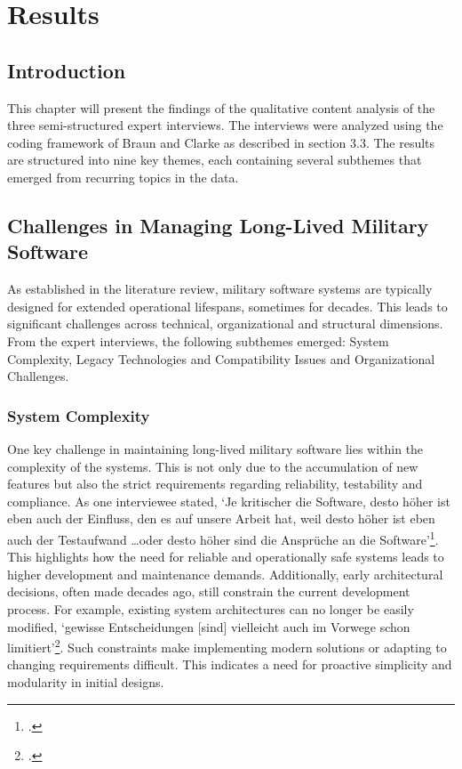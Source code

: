\section{Results}
\subsection{Introduction}
This chapter will present the findings of the qualitative content analysis of the three semi-structured expert interviews. The interviews were analyzed using the coding framework of Braun and Clarke as described in section 3.3.
The results are structured into nine key themes, each containing several subthemes that emerged from recurring topics in the data.
\subsection{Challenges in Managing Long-Lived Military Software}
As established in the literature review, military software systems are typically designed for extended operational lifespans, sometimes for decades. This leads to significant challenges across technical, organizational and structural dimensions.
From the expert interviews, the following subthemes emerged: System Complexity, Legacy Technologies and Compatibility Issues and Organizational Challenges.

\subsubsection{System Complexity}
One key challenge in maintaining long-lived military software lies within the complexity of the systems. This is not only due to the accumulation of new features but also the strict requirements regarding reliability, testability and compliance.
As one interviewee stated, `Je kritischer die Software, desto höher ist eben auch der Einfluss, den es auf unsere Arbeit hat, weil desto höher ist eben auch der Testaufwand \ldots oder desto höher sind die Ansprüche an die Software'\footcite{Interview22025}.
This highlights how the need for reliable and operationally safe systems leads to higher development and maintenance demands. Additionally, early architectural decisions, often made decades ago, 
still constrain the current development process. For example, existing system architectures can no longer be easily modified, `gewisse Entscheidungen [sind] vielleicht auch im Vorwege schon limitiert'\footcite{Interview12025}.
Such constraints make implementing modern solutions or adapting to changing requirements difficult. This indicates a need for proactive simplicity and modularity in initial designs.


